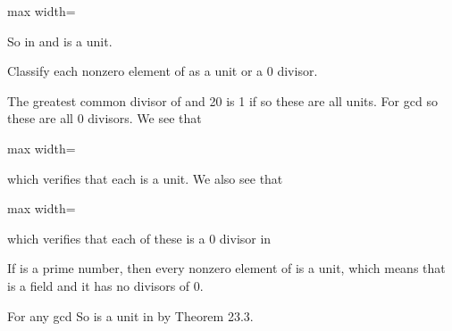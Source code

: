 \documentclass[11pt,oneside]{article}
\begin{document}
\begin{BookBody}
\begin{center}\begin{adjustbox}{max width=\linewidth}\end{adjustbox}\end{center}

\noindent So in  and  is a unit. \BookEnd{\blacklozenge}

 Classify each nonzero element of  as a unit or a 0 divisor.

 The greatest common divisor of  and 20 is 1 if  so these are all units. For  gcd so these are all 0 divisors. We see that

\begin{center}\begin{adjustbox}{max width=\linewidth}\end{adjustbox}\end{center}

\noindent which verifies that each is a unit. We also see that

\begin{center}\begin{adjustbox}{max width=\linewidth}\end{adjustbox}\end{center}

\noindent which verifies that each of these is a 0 divisor in  \BookEnd{\blacktriangle}

 If  is a prime number, then every nonzero element of  is a unit, which means that  is a field and it has no divisors of 0.

 For any  gcd So  is a unit in  by Theorem 23.3. \BookEnd{\blacklozenge}


\end{BookBody}
\end{document}
